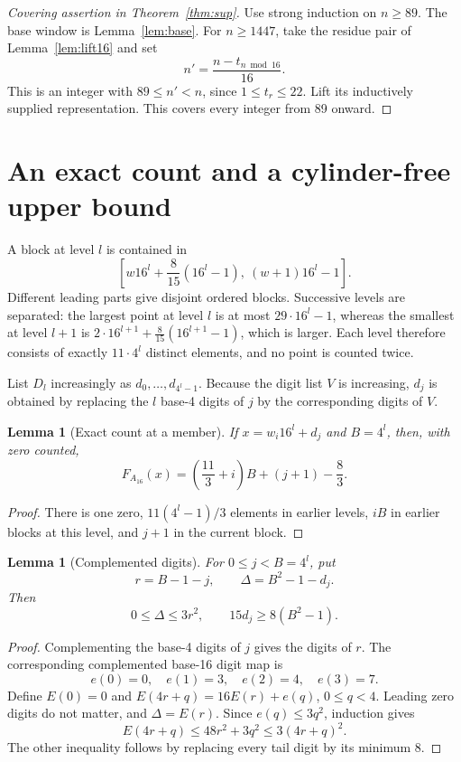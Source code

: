 \documentclass[11pt]{article}
\newtheorem{lemma}[theorem]{Lemma}
\theoremstyle{definition}\newtheorem{definition}[theorem]{Definition}
\theoremstyle{remark}\newtheorem{remark}[theorem]{Remark}
\numberwithin{equation}{section}
\begin{document}
\begin{proof}[Covering assertion in Theorem~\ref{thm:sup}]
Use strong induction on $n\ge89$. The base window is Lemma~\ref{lem:base}. For $n\ge1447$, take the residue pair of Lemma~\ref{lem:lift16} and set
\[
n'=\frac{n-t_{n\bmod16}}{16}.
\]
This is an integer with $89\le n'<n$, since $1\le t_r\le22$. Lift its inductively supplied representation. This covers every integer from 89 onward.
\end{proof}

\section{An exact count and a cylinder-free upper bound}\label{sec:counting}
A block at level $l$ is contained in
\begin{equation}\label{eq:block-range}
\left[w16^l+\frac8{15}(16^l-1),\ (w+1)16^l-1\right].
\end{equation}
Different leading parts give disjoint ordered blocks. Successive levels are separated: the largest point at level $l$ is at most $29\cdot16^l-1$, whereas the smallest at level $l+1$ is
$2\cdot16^{l+1}+\frac8{15}(16^{l+1}-1)$, which is larger. Each level therefore consists of exactly $11\cdot4^l$ distinct elements, and no point is counted twice.

List $D_l$ increasingly as $d_0,\ldots,d_{4^l-1}$. Because the digit list $V$ is increasing, $d_j$ is obtained by replacing the $l$ base-4 digits of $j$ by the corresponding digits of $V$.

\begin{lemma}[Exact count at a member]\label{lem:count}
If $x=w_i16^l+d_j$ and $B=4^l$, then, with zero counted,
\begin{equation}\label{eq:count}
F_{A_{16}}(x)=\left(\frac{11}{3}+i\right)B+(j+1)-\frac83.
\end{equation}
\end{lemma}
\begin{proof}
There is one zero, $11(4^l-1)/3$ elements in earlier levels, $iB$ in earlier blocks at this level, and $j+1$ in the current block.
\end{proof}

\begin{lemma}[Complemented digits]\label{lem:digits}
For $0\le j<B=4^l$, put
\[
r=B-1-j,\qquad \Delta=B^2-1-d_j.
\]
Then
\begin{equation}\label{eq:digitbounds}
0\le\Delta\le3r^2,\qquad 15d_j\ge8(B^2-1).
\end{equation}
\end{lemma}
\begin{proof}
Complementing the base-4 digits of $j$ gives the digits of $r$. The corresponding complemented base-16 digit map is
\[
e(0)=0,\quad e(1)=3,\quad e(2)=4,\quad e(3)=7.
\]
Define $E(0)=0$ and $E(4r+q)=16E(r)+e(q)$, $0\le q<4$. Leading zero digits do not matter, and $\Delta=E(r)$. Since $e(q)\le3q^2$, induction gives
\[
E(4r+q)\le48r^2+3q^2\le3(4r+q)^2.
\]
The other inequality follows by replacing every tail digit by its minimum 8.
\end{proof}
\end{document}
